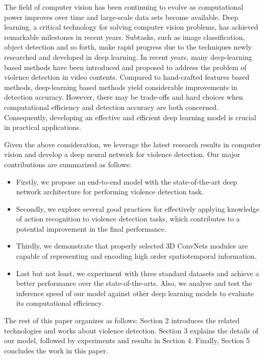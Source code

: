 \documentclass[10pt,twocolumn,letterpaper]{article}
\begin{document}
The field of computer vision has been continuing to evolve as computational power improves over time and large-scale data sets become available.
Deep learning, a critical technology for solving computer vision problems, has achieved remarkable milestones in recent years.
Subtasks, such as image classification, object detection and so forth, make rapid progress due to the techniques newly researched and developed in deep learning.
In recent years, many deep-learning based methods have been introduced and proposed to address the problem of violence detection in video contents.
Compared to hand-crafted features based methods, deep-learning based methods yield considerable improvements in detection accuracy.
However, there may be trade-offs and hard choices when computational efficiency and detection accuracy are both concerned.
Consequently, developing an effective and efficient deep learning model is crucial in practical applications.

Given the above consideration, we leverage the latest research results in computer vision and develop a deep neural network for violence detection. Our major contributions are summarized as follows:

\begin{itemize}
	\item Firstly, we propose an end-to-end model with the state-of-the-art deep network architecture for performing violence detection task.
	\item Secondly, we explore several good practices for effectively applying knowledge of action recognition to violence detection tasks, which contributes to a potential improvement in the final performance.
	\item Thirdly, we demonstrate that properly selected 3D ConvNets modules are capable of representing and encoding high order spatiotemporal information.
	\item Last but not least, we experiment with three standard datasets and achieve a better performance over the state-of-the-arts. Also, we analyse and test the inference speed of our model against other deep learning models to evaluate its computational efficiency.
\end{itemize}

The rest of this paper organizes as follows: Section 2 introduces the related technologies and works about violence detection. Section 3 explains the details of our model, followed by experiments and results in Section 4. Finally, Section 5 concludes the work in this paper.
\end{document}
